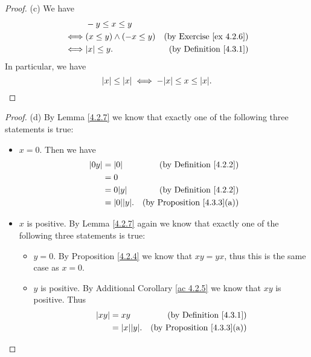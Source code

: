 \begin{proof}{(c)}
    We have
    \begin{align*}
             & -y \leq x \leq y                                                   \\
        \iff & (x \leq y) \land (-x \leq y) & \text{(by Exercise \ref{ex 4.2.6})} \\
        \iff & \abs{x} \leq y.              & \text{(by Definition \ref{4.3.1})}
    \end{align*}
    In particular, we have
    \[
        \abs{x} \leq \abs{x} \iff -\abs{x} \leq x \leq \abs{x}.
    \]
\end{proof}

\begin{proof}{(d)}
    By Lemma \ref{4.2.7} we know that exactly one of the following three statements is true:
    \begin{itemize}
        \item \(x = 0\).
              Then we have
              \begin{align*}
                  \abs{0y} & = \abs{0}          & \text{(by Definition \ref{4.2.2})}     \\
                           & = 0                                                         \\
                           & = 0 \abs{y}        & \text{(by Definition \ref{4.2.2})}     \\
                           & = \abs{0} \abs{y}. & \text{(by Proposition \ref{4.3.3}(a))}
              \end{align*}
        \item \(x\) is positive.
              By Lemma \ref{4.2.7} again we know that exactly one of the following three statements is true:
              \begin{itemize}
                  \item \(y = 0\).
                        By Proposition \ref{4.2.4} we know that \(xy = yx\), thus this is the same case as \(x = 0\).
                  \item \(y\) is positive.
                        By Additional Corollary \ref{ac 4.2.5} we know that \(xy\) is positive.
                        Thus
                        \begin{align*}
                            \abs{xy} & = xy               & \text{(by Definition \ref{4.3.1})}     \\
                                     & = \abs{x} \abs{y}. & \text{(by Proposition \ref{4.3.3}(a))}

\end{align*}
\end{itemize}
\end{itemize}
\end{proof}
